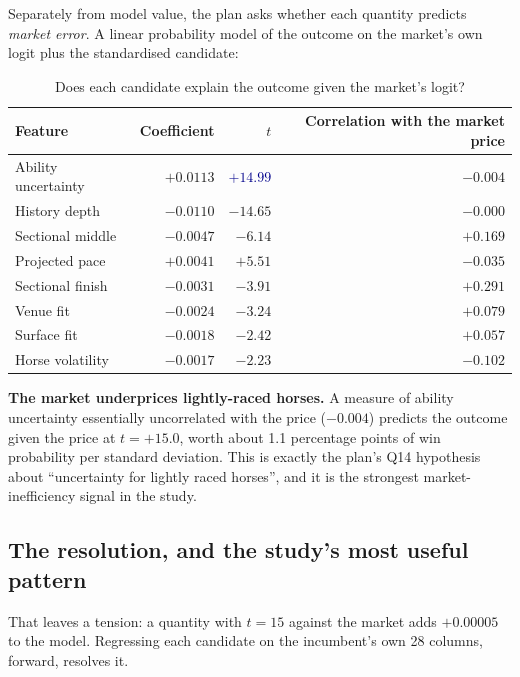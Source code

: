 \documentclass[11pt,a4paper]{article}
\newcommand{\good}[1]{\textcolor{darkblue}{\textbf{#1}}}
\begin{document}
Separately from model value, the plan asks whether each quantity predicts
\emph{market error}. A linear probability model of the outcome on the market's own
logit plus the standardised candidate:

\begin{table}[htbp]\centering\small
\caption{Does each candidate explain the outcome given the market's logit?}
\begin{tabular}{lrrr}
\toprule
Feature & Coefficient & $t$ & Correlation with the market price\\
\midrule
Ability uncertainty & $+0.0113$ & \good{$+14.99$} & $-0.004$\\
History depth & $-0.0110$ & $-14.65$ & $-0.000$\\
Sectional middle & $-0.0047$ & $-6.14$ & $+0.169$\\
Projected pace & $+0.0041$ & $+5.51$ & $-0.035$\\
Sectional finish & $-0.0031$ & $-3.91$ & $+0.291$\\
Venue fit & $-0.0024$ & $-3.24$ & $+0.079$\\
Surface fit & $-0.0018$ & $-2.42$ & $+0.057$\\
Horse volatility & $-0.0017$ & $-2.23$ & $-0.102$\\
\bottomrule
\end{tabular}
\end{table}

\textbf{The market underprices lightly-raced horses.} A measure of ability
uncertainty essentially uncorrelated with the price ($-0.004$) predicts the
outcome given the price at $t=+15.0$, worth about 1.1 percentage points of win
probability per standard deviation. This is exactly the plan's Q14 hypothesis
about ``uncertainty for lightly raced horses'', and it is the strongest
market-inefficiency signal in the study.

\subsection{The resolution, and the study's most useful pattern}

That leaves a tension: a quantity with $t=15$ against the market adds
$+0.00005$ to the model. Regressing each candidate on the incumbent's own 28
columns, forward, resolves it.
\end{document}
